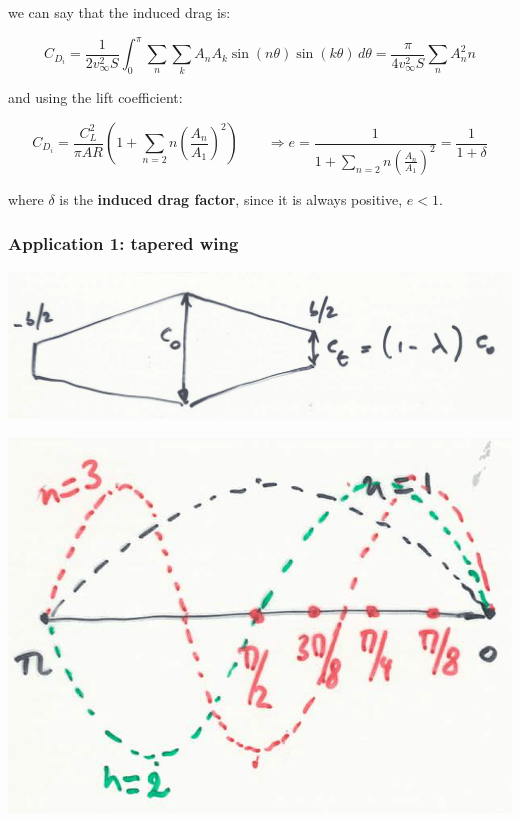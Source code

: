 	we can say that the induced drag is:
	
	\begin{equation}
	C_{D_i} = \frac{1}{2v_\infty ^2 S} \int _0 ^\pi \sum _n \sum _k A_n A_k \sin (n\theta) \sin (k\theta) \, d\theta = \frac{\pi}{4v_\infty ^2 S} \sum _n A_n ^2 n
	\end{equation}
	
	and using the lift coefficient:
	
	\begin{equation}
	C_{D_i} = \frac{C_L^2}{\pi AR}  \left(1+\sum _{n=2} n \left(\frac{A_n}{A_1}\right)^2 \right) \qquad \Rightarrow e = \frac{1}{1+\sum _{n=2} n \left(\frac{A_n}{A_1}\right)^2} = \frac{1}{1+\delta}
	\end{equation}
	
	where $\delta $ is the \textbf{induced drag factor}, since it is always positive, $e<1$. 
	
\subsubsection{Application 1: tapered wing}
	
	\begin{center}
	\begin{minipage}{0.4\textwidth}
	\includegraphics[scale=0.05]{ch3/21}
	\label{fig:3.21}
	\end{minipage}
	\begin{minipage}{0.22\textwidth}
	\includegraphics[scale=0.02]{ch3/22}
	\label{fig:3.22}
	\end{minipage}
	\end{center}

